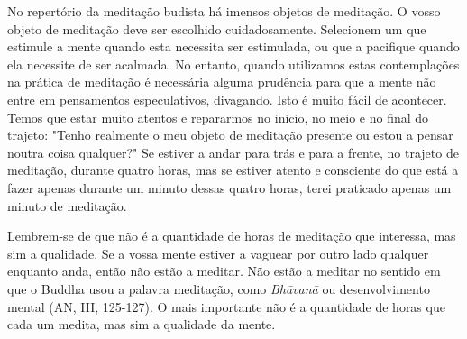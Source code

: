 No repertório da meditação budista há imensos objetos de meditação. O
vosso objeto de meditação deve ser escolhido cuidadosamente. Selecionem
um que estimule a mente quando esta necessita ser estimulada, ou que a
pacifique quando ela necessite de ser acalmada. No entanto, quando
utilizamos estas contemplações na prática de meditação é necessária
alguma prudência para que a mente não entre em pensamentos
especulativos, divagando. Isto é muito fácil de acontecer. Temos que
estar muito atentos e repararmos no início, no meio e no final do
trajeto: "Tenho realmente o meu objeto de meditação presente ou estou a
pensar noutra coisa qualquer?" Se estiver a andar para trás e para a
frente, no trajeto de meditação, durante quatro horas, mas se estiver
atento e consciente do que está a fazer apenas durante um minuto dessas
quatro horas, terei praticado apenas um minuto de meditação.

Lembrem-se de que não é a quantidade de horas de meditação que
interessa, mas sim a qualidade. Se a vossa mente estiver a vaguear por
outro lado qualquer enquanto anda, então não estão a meditar. Não estão
a meditar no sentido em que o Buddha usou a palavra meditação, como
\emph{Bhāvanā} ou desenvolvimento mental (AN, III, 125-127). O mais
importante não é a quantidade de horas que cada um medita, mas sim a
qualidade da mente.

